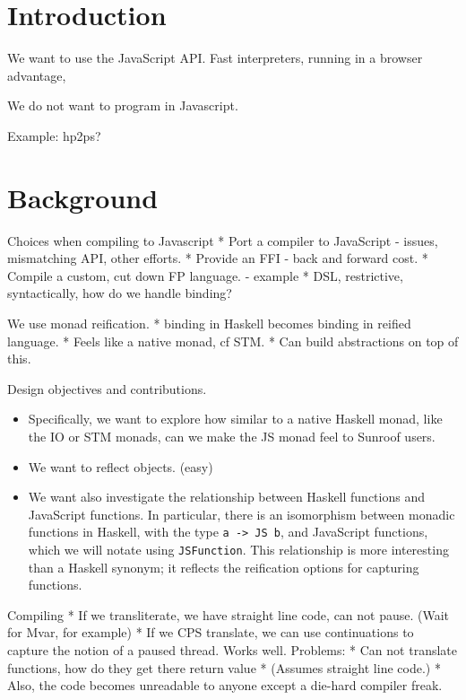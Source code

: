\documentclass{llncs}
\begin{document}
\section{Introduction}

We want to use the JavaScript API. Fast interpreters,
running in a browser advantage, 

We do not want to program in Javascript.

Example: hp2ps?

\section{Background}

Choices when compiling to Javascript
 * Port a compiler to JavaScript - issues, mismatching API, other efforts.
 * Provide an FFI - back and forward cost.
 * Compile a custom, cut down FP language. - example
 * DSL, restrictive, syntactically, how do we handle binding?

We use monad reification.
 * binding in Haskell becomes binding in reified language.
 * Feels like a native monad, cf STM.
 * Can build abstractions on top of this.

Design objectives and contributions.
\begin{itemize}
\item 
Specifically, we want to explore how similar to a native Haskell monad,
like the IO or STM monads, can we make the JS monad feel to Sunroof users.
\item We want to reflect objects. (easy)

\item We want also investigate the relationship between Haskell functions
and JavaScript functions. In particular, there is an isomorphism
between monadic functions in Haskell, with the type \verb|a -> JS b|,
and JavaScript functions, which we will notate using \verb|JSFunction|.
This relationship is more interesting than a Haskell synonym;
it reflects the reification options for capturing functions.
\end{itemize}

 
Compiling
 * If we transliterate, we have straight line code, can not pause.
    (Wait for Mvar, for example)
 * If we CPS translate, we can use continuations to capture the
   notion of a paused thread. Works well.
   Problems:
     * Can not translate functions, how do they get there return value
     * (Assumes straight line code.)
     * Also, the code becomes unreadable to anyone except a die-hard 
       compiler freak.
 
\end{document}
